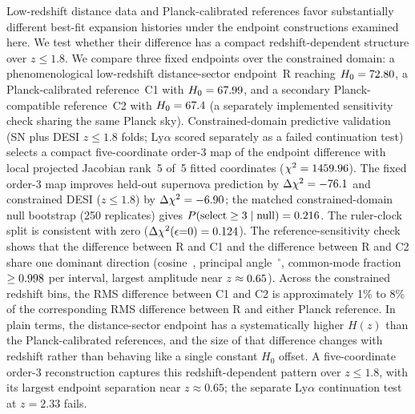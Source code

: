 Low-redshift distance data and Planck-calibrated references favor substantially different best-fit expansion histories under the endpoint constructions examined here. We test whether their difference has a compact redshift-dependent structure over $z\le1.8$.
We compare three fixed endpoints over the constrained domain: a phenomenological low-redshift distance-sector endpoint~R reaching $H_{0}=72.80$\kmsMpc{}, a Planck-calibrated reference~C1 with $H_{0}=67.99$\kmsMpc{}, and a secondary Planck-compatible reference~C2 with $H_{0}=67.4$\kmsMpc{} (a separately implemented sensitivity check sharing the same Planck sky).
Constrained-domain predictive validation (SN plus DESI $z\le1.8$ folds; Ly$\alpha$ scored separately as a failed continuation test) selects a compact five-coordinate order-3 map of the endpoint difference with local projected Jacobian rank~5 of~5 fitted coordinates ($\chi^{2}=1459.96{}$).
The fixed order-3 map improves held-out supernova prediction by $\Delta\chi^{2}=-76.1{}$ and constrained DESI ($z\le1.8$) by $\Delta\chi^{2}=-6.90{}$; the matched constrained-domain null bootstrap (250 replicates) gives $P(\mathrm{select}\ge3\mid\mathrm{null})=0.216{}$. The ruler-clock split is consistent with zero ($\Delta\chi^{2}(\epsilon{=}0)=0.124{}$).
The reference-sensitivity check shows that the difference between R and C1 and the difference between R and C2 share one dominant direction (cosine~\GeometryCosineSimilarity{}, principal angle~\GeometryPrincipalAngle$^{\circ}$, common-mode fraction $\ge0.998{}$ per interval, largest amplitude near $z\approx0.65{}$). Across the constrained redshift bins, the RMS difference between C1 and C2 is approximately 1\% to 8\% of the corresponding RMS difference between R and either Planck reference.
In plain terms, the distance-sector endpoint has a systematically higher $H(z)$ than the Planck-calibrated references, and the size of that difference changes with redshift rather than behaving like a single constant $H_0$ offset. A five-coordinate order-3 reconstruction captures this redshift-dependent pattern over $z\le1.8$, with its largest endpoint separation near $z\approx0.65$; the separate Ly$\alpha$ continuation test at $z=2.33$ fails.
